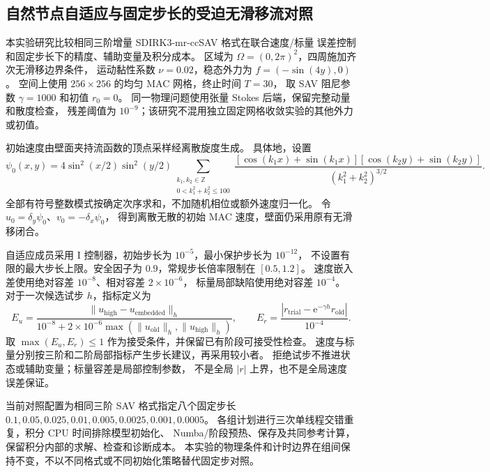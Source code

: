 \subsection{自然节点自适应与固定步长的受迫无滑移流对照}

本实验研究比较相同三阶增量 SDIRK3-mr-ccSAV 格式在联合速度/标量
误差控制和固定步长下的精度、辅助变量及积分成本。
区域为 $\Omega=(0,2\pi)^2$，四周施加齐次无滑移边界条件，
运动黏性系数 $\nu=0.02$，稳态外力为 $f=(-\sin(4y),0)$。
空间上使用 $256\times256$ 的均匀 MAC 网格，终止时间 $T=30$，
取 SAV 阻尼参数 $\gamma=1000$ 和初值 $r_0=0$。
同一物理问题使用张量 Stokes 后端，保留完整动量和散度检查，
残差阈值为 $10^{-9}$；该研究不混用独立固定网格收敛实验的其他外力或初值。

初始速度由壁面夹持流函数的顶点采样经离散旋度生成。
具体地，设置
\begin{equation}
 \psi_0(x,y)=4\sin^2(x/2)\sin^2(y/2)
 \sum_{\substack{k_1,k_2\in\mathbb Z\\0<k_1^2+k_2^2\le100}}
 \frac{[\cos(k_1x)+\sin(k_1x)][\cos(k_2y)+\sin(k_2y)]}
 {(k_1^2+k_2^2)^{3/2}}.
\end{equation}
全部有符号整数模式按确定次序求和，不加随机相位或额外速度归一化。
令 $u_0=\delta_y\psi_0$、$v_0=-\delta_x\psi_0$，
得到离散无散的初始 MAC 速度，壁面仍采用原有无滑移闭合。

自适应成员采用 I 控制器，初始步长为 $10^{-5}$，最小保护步长为 $10^{-12}$，
不设置有限的最大步长上限。安全因子为 $0.9$，常规步长倍率限制在 $[0.5,1.2]$。
速度嵌入差使用绝对容差 $10^{-8}$、相对容差 $2\times10^{-6}$，
标量局部缺陷使用绝对容差 $10^{-4}$。
对于一次候选试步 $h$，指标定义为
\begin{equation}
 E_u=\frac{\|u_{\mathrm{high}}-u_{\mathrm{embedded}}\|_h}
 {10^{-8}+2\times10^{-6}\max(\|u_{\mathrm{old}}\|_h,\|u_{\mathrm{high}}\|_h)},
 \qquad
 E_r=\frac{|r_{\mathrm{trial}}-\mathrm{e}^{-\gamma h}r_{\mathrm{old}}|}{10^{-4}}.
\end{equation}
取 $\max(E_u,E_r)\le1$ 作为接受条件，并保留已有阶段可接受性检查。
速度与标量分别按三阶和二阶局部指标产生步长建议，再采用较小者。
拒绝试步不推进状态或辅助变量；标量容差是局部控制参数，
不是全局 $|r|$ 上界，也不是全局速度误差保证。

当前对照配置为相同三阶 SAV 格式指定八个固定步长
$0.1,0.05,0.025,0.01,0.005,0.0025,0.001,0.0005$。
各组计划进行三次单线程交错重复，积分 CPU 时间排除模型初始化、
Numba/阶段预热、保存及共同参考计算，保留积分内部的求解、检查和诊断成本。
本实验的物理条件和计时边界在组间保持不变，不以不同格式或不同初始化策略替代固定步对照。

